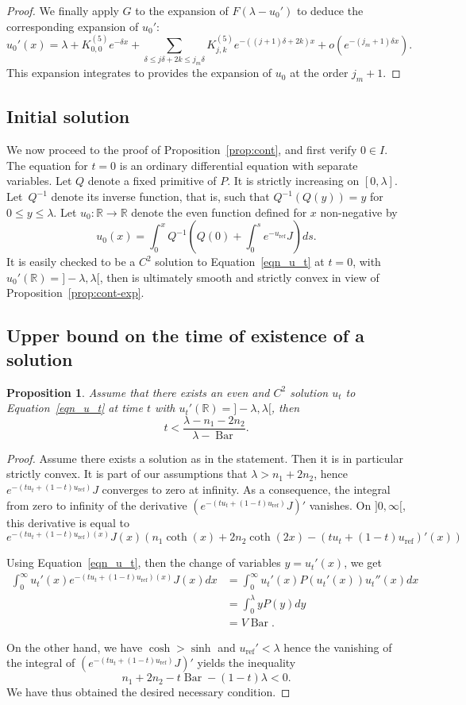 \documentclass[10pt]{amsart}
\theoremstyle{plain}
\newtheorem{prop}[thm]{Proposition}
\theoremstyle{definition}
\DeclareMathOperator{\barDH}{Bar}
\let\Subsection\subsection\let\Subsubsection\subsubsection
\begin{document}
\begin{proof}
We finally apply $G$ to the expansion of $F(\lambda-u_0')$ to deduce the
corresponding expansion of $u_0'$:
\[ u_0'(x)=\lambda+ K_{0,0}^{(5)}e^{-\delta x} +
\sum_{\delta\leq j\delta+2k\leq j_m\delta}K_{j,k}^{(5)}e^{-((j+1)\delta+2k)x}
+o(e^{-(j_m+1)\delta x}). \]
This expansion integrates to provides the expansion of $u_0$ at the
order $j_m+1$.
\end{proof}

\subsection{Initial solution}

We now proceed to the proof of Proposition~\ref{prop:cont}, and first verify $0\in I$.
The equation for $t=0$ is an ordinary differential equation with separate variables.
Let $Q$ denote a fixed primitive of $P$.
It is strictly increasing on $[0,\lambda]$. Let~$Q^{-1}$ denote its inverse
function, that is, such that $Q^{-1}(Q(y))=y$
for $0\leq y \leq \lambda$.
Let $u_0:\mathbb{R}\to\mathbb{R}$ denote the even function defined
for $x$ non-negative by
\[ u_0(x)=\int_0^x Q^{-1}\left(Q(0)+\int_0^s e^{-u_{\mathrm{ref}}}J \right)ds. \]
It is easily checked to be a $C^2$ solution
to Equation~\eqref{eqn_u_t} at $t=0$,
with $u_0'(\mathbb{R})={}]-\lambda,\lambda[$,
then is ultimately smooth and strictly convex in view of Proposition~\ref{prop:cont-exp}.

\Subsection{Upper bound on the time of existence of a solution}

\begin{prop}
Assume that there exists an even and $C^2$ solution $u_t$
to Equation~\eqref{eqn_u_t} at time $t$
with $u_t'(\mathbb{R})={}]-\lambda,\lambda[$, then
\[ t< \frac{\lambda-n_1-2n_2}{\lambda-\barDH}. \]
\end{prop}

\begin{proof}
Assume there exists a solution as in the statement. Then it is in particular
strictly convex.
It is part of our assumptions
that $\lambda>n_1+2n_2$, hence $e^{-(tu_t+(1-t)u_{\mathrm{ref}})}J$
converges to zero at infinity.
As a consequence, the integral from zero to infinity of the derivative
$(e^{-(tu_t+(1-t)u_{\mathrm{ref}})}J)'$
vanishes.
On $]0,\infty[$, this derivative is equal to
\[
e^{-(tu_t+(1-t)u_{\mathrm{ref}})(x)}J(x)\left(n_1\coth(x)+
2n_2\coth(2x)-(tu_t+(1-t)u_{\mathrm{ref}})'(x)\right) \]

Using Equation~\eqref{eqn_u_t}, then the change of variables $y=u_t'(x)$,
we get
\begin{align*}
\int_0^{\infty}u_t'(x)e^{-(tu_t+(1-t)u_{\mathrm{ref}})(x)}J(x)dx & =
\int_0^{\infty}u_t'(x)P(u_t'(x))u_t''(x)dx \\
& = \int_0^{\lambda}yP(y)dy \\
& = V \barDH.
\end{align*}

On the other hand, we have $\cosh>\sinh$ and $u_{\mathrm{ref}}'<\lambda$
hence the vanishing of the integral of $(e^{-(tu_t+(1-t)u_{\mathrm{ref}})}J)'$
yields the inequality
\[ n_1+2n_2-t\barDH-(1-t)\lambda<0. \]
We have thus obtained the desired necessary condition.
\end{proof}
\end{document}
